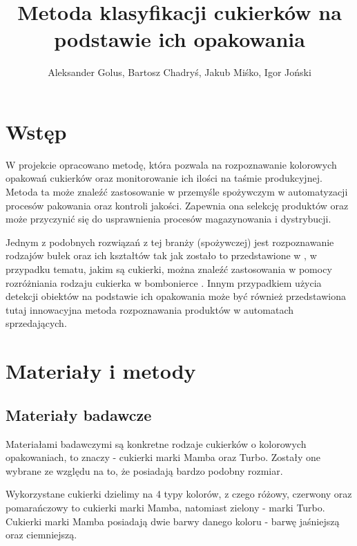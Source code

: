 \documentclass{article}
\title{Metoda klasyfikacji cukierków na podstawie ich opakowania}
\author{Aleksander Golus, Bartosz Chadryś, Jakub Miśko, Igor Joński}
\begin{document}
\maketitle


\section{Wstęp}
\label{Wstęp}
W projekcie opracowano metodę, która pozwala na rozpoznawanie kolorowych opakowań cukierków oraz monitorowanie ich ilości na taśmie produkcyjnej. Metoda ta może znaleźć zastosowanie w przemyśle spożywczym w automatyzacji procesów pakowania oraz kontroli jakości. Zapewnia ona selekcję produktów oraz może przyczynić się do usprawnienia procesów magazynowania i dystrybucji.

Jednym z podobnych rozwiązań z tej branży (spożywczej) jest rozpoznawanie rodzajów bułek oraz ich kształtów tak jak zostało to przedstawione w \cite{virtuslab}, w przypadku tematu, jakim są cukierki, można znaleźć zastosowania w pomocy rozróżniania rodzaju cukierka w bombonierce \cite{chocolates}. Innym przypadkiem użycia detekcji obiektów na podstawie ich opakowania może być również przedstawiona tutaj \cite{vending} innowacyjna metoda rozpoznawania produktów w automatach sprzedających.

\section{Materiały i metody}
\label{Materiały i metody}
\subsection{Materiały badawcze}
\label{Materiały badawcze}
Materiałami badawczymi są konkretne rodzaje cukierków o kolorowych opakowaniach, to znaczy - cukierki marki Mamba oraz Turbo. Zostały one wybrane ze względu na to, że posiadają bardzo podobny rozmiar.

Wykorzystane cukierki dzielimy na 4 typy kolorów, z czego różowy, czerwony oraz pomarańczowy to cukierki marki Mamba, natomiast zielony - marki Turbo. Cukierki marki Mamba posiadają dwie barwy danego koloru - barwę jaśniejszą oraz ciemniejszą.
\end{document}
